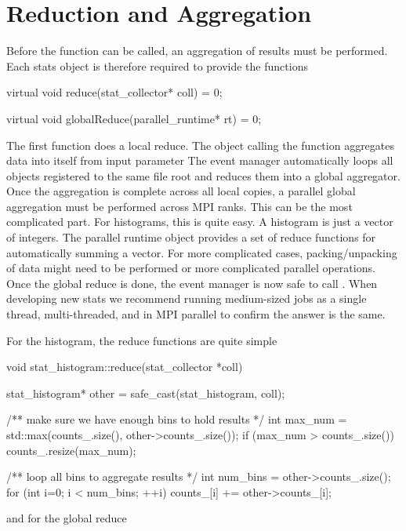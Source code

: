 \section{Reduction and Aggregation}\label{sec:reduceStats}
Before the  function can be called, an aggregation of results must be performed.
Each stats object is therefore required to provide the functions

\begin{CppCode} 
virtual void reduce(stat_collector* coll) = 0;

virtual void globalReduce(parallel_runtime* rt) = 0;
\end{CppCode}
The first function does a local reduce.
The object calling the  function aggregates data into itself from input parameter 
The event manager automatically loops all objects registered to the same file root and reduces them into a global aggregator.
Once the aggregation is complete across all local copies,
a parallel global aggregation must be performed across MPI ranks.
This can be the most complicated part.
For histograms, this is quite easy.
A histogram is just a vector of integers.
The \sstmacro parallel runtime object provides a set of reduce functions for automatically summing a vector.
For more complicated cases, packing/unpacking of data might need to be performed or more complicated parallel operations.
Once the global reduce is done, the event manager is now safe to call .
When developing new stats we recommend running medium-sized jobs as a single thread, multi-threaded, and in MPI parallel to confirm the answer is the same.

For the histogram, the reduce functions are quite simple

\begin{CppCode}
void stat_histogram::reduce(stat_collector *coll)
{
  stat_histogram* other = safe_cast(stat_histogram, coll);

  /** make sure we have enough bins to hold results */
  int max_num = std::max(counts_.size(), other->counts_.size());
  if (max_num > counts_.size()){
    counts_.resize(max_num);
  }

  /** loop all bins to aggregate results */
  int num_bins = other->counts_.size();
  for (int i=0; i < num_bins; ++i){
    counts_[i] += other->counts_[i];
  }
}
\end{CppCode}

and for the global reduce

